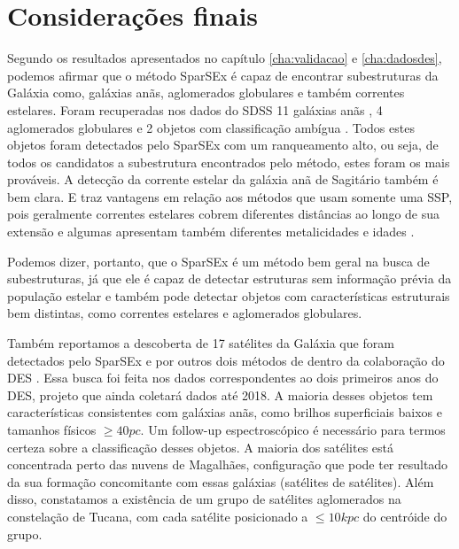 \documentclass[
	12pt,				%
	openany,			%
	oneside,			%
	a4paper,			%
	english,			%
	brazil				%
	]{abntex2}
\begin{document}
\chapter{Considerações finais}
Segundo os resultados apresentados no capítulo \ref{cha:validacao} e \ref{cha:dadosdes}, podemos afirmar que o método SparSEx é capaz de encontrar subestruturas da Galáxia como, galáxias anãs, aglomerados globulares e também correntes estelares. Foram recuperadas nos dados do SDSS 11 galáxias anãs \cite{2007ApJ...654..897B,2006AAS...20917805Z}, 4 aglomerados globulares \cite{2007ApJ...669..337K,2002ApJS..141..123W,2010ApJ...712L.103B} e 2 objetos com classificação ambígua \cite{2011MNRAS.416..393B,2010ApJ...712L.103B}. Todos estes objetos foram detectados pelo SparSEx com um ranqueamento alto, ou seja, de todos os candidatos a subestrutura encontrados pelo método, estes foram os mais prováveis. A detecção da corrente estelar da galáxia anã de Sagitário também é bem clara. E traz vantagens em relação aos métodos que usam somente uma SSP, pois geralmente correntes estelares cobrem diferentes distâncias ao longo de sua extensão e algumas apresentam também diferentes metalicidades e idades \cite{2012ApJ...750...80K}. \par
Podemos dizer, portanto, que o SparSEx é um método bem geral na busca de subestruturas, já que ele é capaz de detectar estruturas sem informação prévia da população estelar e também pode detectar objetos com características estruturais bem distintas, como correntes estelares e aglomerados globulares. \par
Também reportamos a descoberta de 17 satélites da Galáxia que foram detectados pelo SparSEx e por outros dois métodos de dentro da colaboração do DES  \cite{2015ApJ...807...50B,2015arXiv150803622T,2015arXiv150802381L}. Essa busca foi feita nos dados correspondentes ao dois primeiros anos do DES, projeto que ainda coletará dados até 2018. A maioria desses objetos tem características consistentes com galáxias anãs, como brilhos superficiais baixos e tamanhos físicos $\ge 40pc$. Um follow-up espectroscópico é necessário para termos certeza sobre a classificação desses objetos. A maioria dos satélites está concentrada perto das nuvens de Magalhães, configuração que pode ter resultado da sua formação concomitante com essas galáxias (satélites de satélites). Além disso, constatamos a existência de um grupo de satélites aglomerados na constelação de Tucana, com cada satélite posicionado a $\le10kpc$ do centróide do grupo. \par
\end{document}
